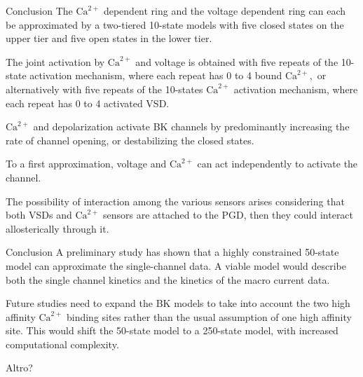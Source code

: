 \documentclass{beamer}
\newcommand{\ca}{\text{Ca}^{2+}}
\begin{document}
\begin{frame}{Conclusion}
The $\ca$ dependent ring and the voltage dependent ring can each be approximated by a two-tiered 10-state models with five closed states on the upper tier and five open states in the lower tier.

The joint activation by $\ca$ and voltage is obtained with five repeats of the 10-state activation mechanism, where each repeat has 0 to 4 bound $\ca,$ or alternatively with five repeats of the 10-states $\ca$ activation mechanism, where each repeat has 0 to 4 activated VSD.

$\ca$ and depolarization activate BK channels by predominantly increasing the rate of channel opening, or destabilizing the closed states.

To a first approximation, voltage and $\ca$ can act independently to activate the channel.

The possibility of interaction among the various sensors arises considering that both VSDs and $\ca$ sensors are attached to the PGD, then they could interact allosterically through it.
\end{frame}

\begin{frame}{Conclusion}
A preliminary study has shown that a highly constrained 50-state model can approximate the single-channel data.
A viable model would describe both the single channel kinetics and the kinetics of the macro current data.

Future studies need to expand the BK models to take into account the two high affinity $\ca$ binding sites rather than the usual assumption of one high affinity site.
This would shift the 50-state model to a 250-state model, with increased computational complexity.
\end{frame}

\begin{frame}{Altro?}

\end{frame}
\end{document}
